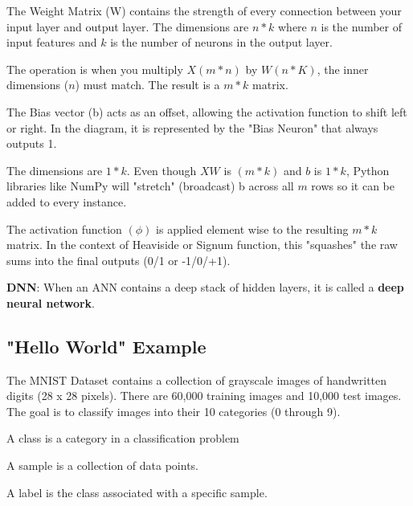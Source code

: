 {The Weight Matrix (W) contains the strength of every connection between your input layer and output layer. The dimensions are $n * k$ where $n$ is the number of input features and $k$ is the number of neurons in the output layer.

The operation is when you multiply $X(m*n)$ by $W(n*K)$, the inner dimensions ($n$) must match. The result is a $m*k$ matrix.

The Bias vector (b) acts as an offset, allowing the activation function to shift left or right. In the diagram, it is represented by the "Bias Neuron" that always outputs 1.

The dimensions are $1*k$. Even though $XW$ is $(m*k)$ and $b$ is $1*k$, Python libraries like NumPy will "stretch" (broadcast) b across all $m$ rows so it can be added to every instance.

The activation function $(\phi)$ is applied element wise to the resulting $m*k$ matrix. In the context of Heaviside or Signum function, this "squashes" the raw sums into the final outputs (0/1 or -1/0/+1).







\textbf{DNN}: When an ANN contains a deep stack of hidden layers, it is called a \textbf{deep neural network}.


\vs
\subsection{"Hello World" Example}
\vs

The MNIST Dataset contains a collection of grayscale images of handwritten digits (28 x 28 pixels). There are 60,000 training images and 10,000 test images. The goal is to classify images into their 10 categories (0 through 9).



A class is a category in a classification problem

A sample is a collection of data points.

A label is the class associated with a specific sample.

}
